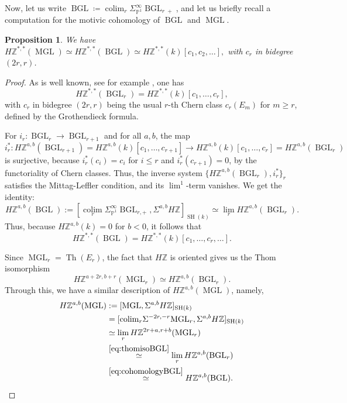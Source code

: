 \documentclass[10pt]{amsart}
\theoremstyle{definition}
\theoremstyle{plain}
\newtheorem{prop}[defn]{Proposition}
\numberwithin{equation}{section}
\newcommand{\0}{\emptyset}
\renewcommand{\P}{{\mathbb P}}
\newcommand{\Z}{{\mathbb Z}}
\newcommand{\MGL}{{\operatorname{MGL}}}
\newcommand{\BGL}{{\operatorname{BGL}}}
\newcommand{\SH}{{\operatorname{SH}}}
\newcommand{\Th}{{\operatorname{Th}}}
\newcommand{\colim}{{\operatorname*{colim}}}
\begin{document}
Now, let us write $\BGL \coloneqq \colim_r \Sigma_{\P^1}^{\infty}\BGL_{r \; +}$, and let us briefly recall a computation for the motivic cohomology of $\BGL$ and $\MGL$.

\begin{prop}
\label{prop:MotCohOfMGL}
    We have
    $H\Z^{*,*}(\MGL)\simeq H\Z^{*,*}(\BGL)\simeq H\Z^{*,*}(k)[c_1,c_2, \ldots],$
    with $c_r$ in bidegree $(2r,r)$.
\end{prop}

\begin{proof}
As is well known, see for example \cite[Theorem 2.2]{Panin:algcob}, one has
$$H\Z^{*,*}(\BGL_r)=H\Z^{*,*}(k)[c_1,\ldots, c_r],$$
with $c_r$ in bidegree $(2r,r)$ being the usual $r$-th Chern class $c_r(E_m)$ for $m\ge r$, defined by the Grothendieck formula.

For $i_r:\BGL_r\to\BGL_{r+1}$ and for all $a,b$, the map
$$i_r^*:H\Z^{a,b}(\BGL_{r+1})=H\Z^{a,b}(k)[c_1, \ldots, c_{r+1}] \to H\Z^{a,b}(k)[c_1, \ldots, c_r]=H\Z^{a,b}(\BGL_r)$$
is surjective, because $i_r^*(c_i)=c_i$ for $i\le r$ and $i_r^*(c_{r+1})=0$, by the functoriality of Chern classes. Thus, the inverse system $\{H\Z^{a,b}(\BGL_r), i_r^*\}_r$ satisfies the Mittag-Leffler condition, and its $\lim^1$-term vanishes. We get the identity: 
\begin{equation}
\label{eq:cohomologyBGL}
    H\Z^{a,b}(\BGL):=[\colim_r\Sigma^\infty_{\P^1}\BGL_{r,+}, \Sigma^{a,b}H\Z]_{\SH(k)}\simeq
\lim_rH\Z^{a,b}(\BGL_r).
\end{equation}
Thus, because $H\Z^{a,b}(k)=0$ for $b<0$, it follows that
$$H\Z^{*,*}(\BGL)=H\Z^{*,*}(k)[c_1,\ldots, c_r, \ldots].$$

Since $\MGL_r=\Th(E_r)$, the fact that $H\Z$ is oriented gives us the Thom isomorphism
\begin{equation}
\label{eq:thomisoBGL}
    H\Z^{a+2r, b+r}(\MGL_r)\simeq H\Z^{a,b}(\BGL_r).
\end{equation}
Through this, we have a similar description of $H\Z^{a,b}(\MGL)$, namely,
\begin{align*}
H\Z^{a,b}(\MGL)&:=[\MGL, \Sigma^{a,b}H\Z]_{\SH(k)}\\
&=[\colim_r\Sigma^{-2r, -r}\MGL_r, \Sigma^{a,b}H\Z]_{\SH(k)}\\
&\simeq \lim_r H\Z^{2r+a, r+b}(\MGL_r)\\
&\overset{\eqref{eq:thomisoBGL}}{\simeq}\lim_r H\Z^{a,b}(\BGL_r)\\
&\overset{\eqref{eq:cohomologyBGL}}{\simeq} H\Z^{a,b}(\BGL).
\end{align*}
\end{proof}
\end{document}
